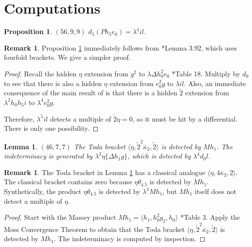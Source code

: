\documentclass{amsart}
\newtheorem{lemma}[thm]{Lemma}
\newtheorem{prop}[thm]{Proposition}
\theoremstyle{definition}
\newtheorem{rmk}[thm]{Remark}
\newcommand{\hsf}{\widetilde{2}}
\newcommand{\lemdeg}[1]{$({#1})$}
\newcommand{\D}{\Delta}
\newcommand{\kappabar}{\overline{\kappa}}
\begin{document}
\section{Computations}
\label{sctn:computations}

\begin{prop}
\label{prop:d5-Ph5e0}
\lemdeg{56, 9, 9}
$d_5(P h_5 e_0) = \lambda^4 i l$.
\end{prop}

\begin{rmk}
Proposition \ref{prop:d5-Ph5e0} immediately follows from \cite{I20}*{Lemma 3.92}, which uses fourfold brackets.  We give a simpler proof.
\end{rmk}

\begin{proof}
Recall the hidden $\eta$ extension from $g^2$ to $\lambda \D h_0^2 e_0$
\cite{IWX}*{Table 18}.
Multiply by $d_0$ to see that there is also a hidden $\eta$ extension
from $e_0^2 g$ to $\lambda i l$.
Also, 
an immediate consequence of the main result of \cite{Burklund21} is that
there is a hidden $\hsf$ extension from
$\lambda^2 h_0 h_5 i$ to $\lambda^4 e_0^2 g$.

Therefore, $\lambda^5 i l$ detects a multiple of $\hsf \eta = 0$,
so it must be hit by a differential.  There is only one possibility.
\end{proof}

\begin{lemma}
\label{lem:eta,h^2kappabar2,h}
\lemdeg{46, 7, 7}
The Toda bracket
$\langle \eta, \hsf^2 \kappabar_2, \hsf \rangle$
is detected by $M h_1$. 
The indeterminacy is generated by 
$\lambda^3 \eta \{ \D h_1 g \}$, which is detected by $\lambda^4 d_0 l$.
\end{lemma}

\begin{rmk}
The Toda bracket in Lemma \ref{lem:eta,h^2kappabar2,h} has a classical
analogue $\langle \eta, 4 \kappabar_2, 2 \rangle$.
The classical bracket contains zero because $\eta \theta_{4.5}$
is detected by $M h_1$.
Synthetically, the product $\eta \theta_{4.5}$ is detected by
$\lambda^3 M h_1$, but $M h_1$ itself does not detect a multiple
of $\eta$.
\end{rmk}

\begin{proof}
Start with
the Massey product $M h_1 = \langle h_1, h_0^2 g_2, h_0 \rangle$
\cite{IWX}*{Table 3}.
Apply the Moss Convergence Theorem \cite{BK21} \cite{Moss70}  to
obtain that 
the Toda bracket
$\langle \eta, \hsf^2 \kappabar_2, \hsf \rangle$ is detected by
$M h_1$.
The indeterminacy is computed by inspection.
\end{proof}
\end{document}
